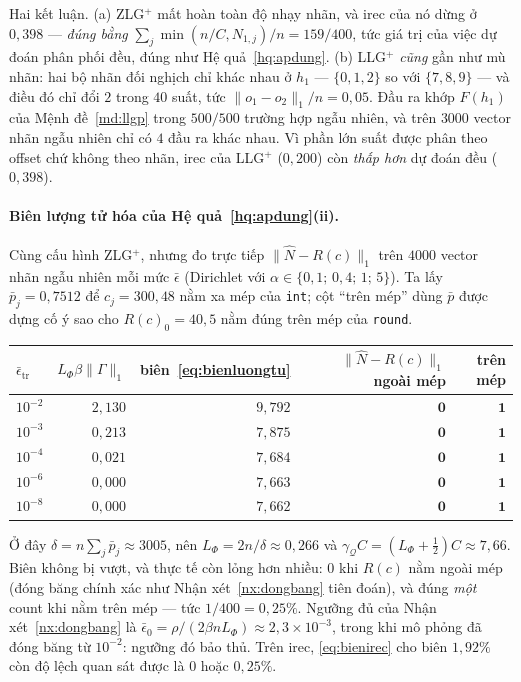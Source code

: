 \documentclass[11pt]{article}
\theoremstyle{remark}
\begin{document}
Hai kết luận. (a) ZLG$^+$ mất hoàn toàn độ nhạy nhãn, và irec của nó dừng ở
$0{,}398$ --- \emph{đúng bằng} $\sum_j\min(n/C, N_{1,j})/n = 159/400$, tức
giá trị của việc dự đoán phân phối đều, đúng như Hệ quả~\ref{hq:apdung}.
(b) LLG$^+$ \emph{cũng} gần như mù nhãn: hai bộ nhãn đối nghịch chỉ khác nhau
ở $h_1$ --- $\{0,1,2\}$ so với $\{7,8,9\}$ --- và điều đó chỉ đổi $2$ trong
$40$ suất, tức $\|o_1-o_2\|_1/n = 0{,}05$. Đầu ra khớp $F(h_1)$ của
Mệnh đề~\ref{md:llgp} trong $500/500$ trường hợp ngẫu nhiên, và trên $3000$
vector nhãn ngẫu nhiên chỉ có $4$ đầu ra khác nhau. Vì phần lớn suất được
phân theo offset chứ không theo nhãn, irec của LLG$^+$ ($0{,}200$) còn
\emph{thấp hơn} dự đoán đều ($0{,}398$).

\paragraph{Biên lượng tử hóa của Hệ quả~\ref{hq:apdung}(ii).}
Cùng cấu hình ZLG$^+$, nhưng đo trực tiếp
$\|\widehat N - R(c)\|_1$ trên $4000$ vector nhãn ngẫu nhiên
mỗi mức $\bar\epsilon$ (Dirichlet với $\alpha \in \{0{,}1;\,0{,}4;\,1;\,5\}$).
Ta lấy $\bar p_j = 0{,}7512$ để $c_j = 300{,}48$ nằm xa mép của \texttt{int};
cột ``trên mép'' dùng $\bar p$ được dựng cố ý sao cho $R(c)_0 = 40{,}5$ nằm
đúng trên mép của \texttt{round}.

\begin{center}
\footnotesize
\begin{tabular}{@{}lrrrr@{}}
\toprule
$\bar\epsilon_{\mathrm{tr}}$ & $L_\Phi\beta\|\Gamma\|_1$ & biên~\eqref{eq:bienluongtu}
 & $\|\widehat N - R(c)\|_1$ ngoài mép & trên mép \\
\midrule
$10^{-2}$ & $2{,}130$ & $9{,}792$ & $\mathbf{0}$ & $\mathbf{1}$ \\
$10^{-3}$ & $0{,}213$ & $7{,}875$ & $\mathbf{0}$ & $\mathbf{1}$ \\
$10^{-4}$ & $0{,}021$ & $7{,}684$ & $\mathbf{0}$ & $\mathbf{1}$ \\
$10^{-6}$ & $0{,}000$ & $7{,}663$ & $\mathbf{0}$ & $\mathbf{1}$ \\
$10^{-8}$ & $0{,}000$ & $7{,}662$ & $\mathbf{0}$ & $\mathbf{1}$ \\
\bottomrule
\end{tabular}
\end{center}

Ở đây $\delta = n\sum_j \bar p_j \approx 3005$, nên $L_\Phi = 2n/\delta
\approx 0{,}266$ và $\gamma_{\mathcal{Q}}C = (L_\Phi+\tfrac12)C \approx
7{,}66$. Biên không bị vượt, và thực tế còn lỏng hơn nhiều: $0$ khi $R(c)$
nằm ngoài mép (đóng băng chính xác như Nhận xét~\ref{nx:dongbang} tiên đoán),
và đúng \emph{một} count khi nằm trên mép --- tức $1/400 = 0{,}25\%$. Ngưỡng
đủ của Nhận xét~\ref{nx:dongbang} là
$\bar\epsilon_0 = \rho/(2\beta nL_\Phi) \approx 2{,}3\times10^{-3}$, trong khi
mô phỏng đã đóng băng từ $10^{-2}$: ngưỡng đó bảo thủ. Trên $\mathrm{irec}$,
\eqref{eq:bienirec} cho biên $1{,}92\%$ còn độ lệch quan sát được là $0$ hoặc
$0{,}25\%$.
\end{document}
